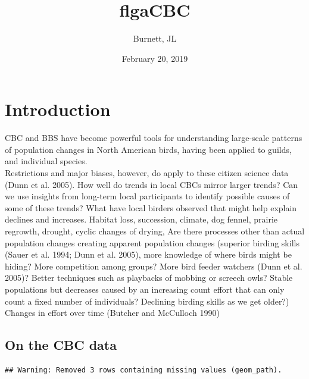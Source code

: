 \documentclass[]{article}
\title{flgaCBC}
\author{Burnett, JL}
\date{February 20, 2019}
\begin{document}
\maketitle

\section{Introduction}\label{introduction}

CBC and BBS have become powerful tools for understanding large-scale
patterns of population changes in North American birds, having been
applied to guilds, and individual species.\\
Restrictions and major biases, however, do apply to these citizen
science data (Dunn et al. 2005). How well do trends in local CBCs mirror
larger trends? Can we use insights from long-term local participants to
identify possible causes of some of these trends? What have local
birders observed that might help explain declines and increases. Habitat
loss, succession, climate, dog fennel, prairie regrowth, drought, cyclic
changes of drying, Are there processes other than actual population
changes creating apparent population changes (superior birding skills
(Sauer et al. 1994; Dunn et al. 2005), more knowledge of where birds
might be hiding? More competition among groups? More bird feeder
watchers (Dunn et al. 2005)? Better techniques such as playbacks of
mobbing or screech owls? Stable populations but decreases caused by an
increasing count effort that can only count a fixed number of
individuals? Declining birding skills as we get older?) Changes in
effort over time (Butcher and McCulloch 1990)

\subsection{On the CBC data}\label{on-the-cbc-data}

\begin{verbatim}
## Warning: Removed 3 rows containing missing values (geom_path).
\end{verbatim}
\end{document}
